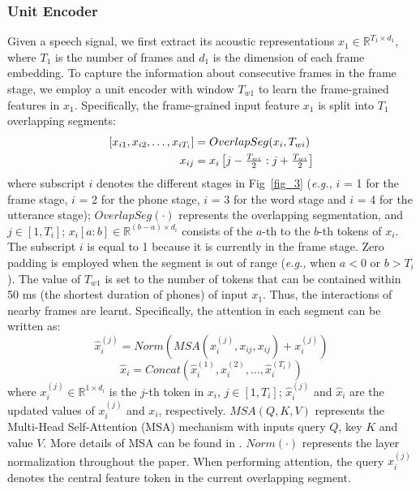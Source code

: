 \documentclass[lettersize,journal]{IEEEtran}
\begin{document}
\subsubsection{Unit Encoder}

Given a speech signal, we first extract its acoustic representations $x_{1} \in \mathbb{R}^{T_1 \times d_1}$, where $T_1$ is the number of frames and $d_1$ is the dimension of each frame embedding. To capture the information about consecutive frames in the frame stage, we employ a unit encoder with window $T_{w1}$ to learn the frame-grained features in $x_1$. Specifically, the frame-grained input feature $x_1$ is split into $T_1$ overlapping segments:
\begin{equation}
\begin{aligned}
\relax[x_{i1}, x_{i2}, \dots, x_{iT_i}] &= OverlapSeg(x_i, T_{wi})  \\ x_{ij} &= x_i\left[j-\tfrac{T_{wi}}{2}:j+\tfrac{T_{wi}}{2}\right]
\label{eq5}
\end{aligned}
\end{equation}
where subscript $i$ denotes the different stages in Fig~\ref{fig_3} (\textit{e.g.,} $i$ = 1 for the frame stage, $i$ = 2 for the phone stage, $i$ = 3 for the word stage and $i$ = 4 for the utterance stage);
$OverlapSeg(\cdot)$ represents the overlapping segmentation, and $j \in [1, T_i]$; $x_i[a:b] \in \mathbb{R}^{(b-a) \times d_i}$ consists of the $a$-th to the $b$-th tokens of $x_i$. The subscript $i$ is equal to 1 because it is currently in the frame stage. Zero padding is employed when the segment is out of range (\textit{e.g.,} when $a < 0 $ or $b > T_i$). The value of $T_{w1}$ is set to the number of tokens that can be contained within 50 ms (the shortest duration of phones) of input $x_1$. Thus, the interactions of nearby frames are learnt. Specifically, the attention in each segment can be written as:
\begin{equation}
\hat{x}_i^{(j)} = Norm(MSA(x_i^{(j)}, x_{ij}, x_{ij}) + x_i^{(j)})
\label{eq6}
\end{equation}
\begin{equation}
\hat{x}_i = Concat(\hat{x}_i^{(1)}, \hat{x}_i^{(2)}, \dots, \hat{x}_i^{(T_i)})
\label{eq7}
\end{equation}
where $x_i^{(j)} \in \mathbb{R}^{1 \times d_i}$ is the $j$-th token in $x_i$, $j \in [1, T_i]$; $\hat{x}_i^{(j)}$ and $\hat{x}_i$ are the updated values of $x_i^{(j)}$ and $x_i$, respectively. $MSA(Q,K,V)$ represents the Multi-Head Self-Attention (MSA) mechanism with inputs query $Q$, key $K$ and value $V$. More details of MSA can be found in \cite{Transformer}. $Norm(\cdot)$ represents the layer normalization \cite{LN} throughout the paper. When performing attention, the query $x_i^{(j)}$ denotes the central feature token in the current overlapping segment. 
\end{document}
